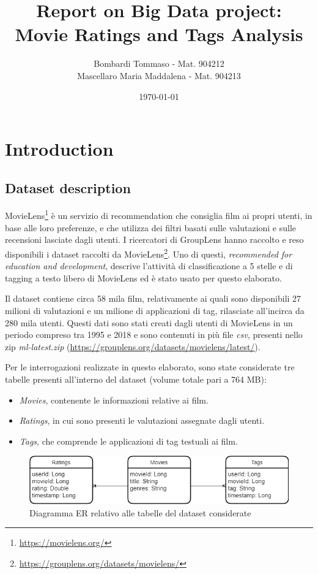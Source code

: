 \documentclass[10pt]{article}
\title{\textbf{Report on Big Data project: \\Movie Ratings and Tags Analysis}}
\author{
	Bombardi Tommaso - Mat. 904212\\
	Mascellaro Maria Maddalena - Mat. 904213}
\date{\today}
\begin{document}
\maketitle
\newpage
\tableofcontents
\newpage

\section{Introduction}

\subsection{Dataset description}

MovieLens\footnote{\url{https://movielens.org/}} è un servizio di recommendation che consiglia film ai propri utenti, in base alle loro preferenze, e che utilizza dei filtri basati sulle valutazioni e sulle recensioni lasciate dagli utenti. I ricercatori di GroupLens hanno raccolto e reso disponibili i dataset raccolti da MovieLens\footnote{\url{https://grouplens.org/datasets/movielens/}}. Uno di questi, \textit{recommended for education and development}, descrive l'attività di classificazione a 5 stelle e di tagging a testo libero di MovieLens ed è stato usato per questo elaborato.

Il dataset contiene circa 58 mila film, relativamente ai quali sono disponibili 27 milioni di valutazioni e un milione di applicazioni di tag, rilasciate all'incirca da 280 mila utenti. Questi dati sono stati creati dagli utenti di MovieLens in un periodo compreso tra 1995 e 2018 e sono contenuti in più file \textit{csv}, presenti nello zip \textit{ml-latest.zip} (\url{https://grouplens.org/datasets/movielens/latest/}).

Per le interrogazioni realizzate in questo elaborato, sono state considerate tre tabelle presenti all'interno del dataset (volume totale pari a 764 MB):

\begin{itemize}
\item \textit{Movies}, contenente le informazioni relative ai film.
\item \textit{Ratings}, in cui sono presenti le valutazioni assegnate dagli utenti.
\item \textit{Tags}, che comprende le applicazioni di tag testuali ai film.
\end{itemize}

\begin{figure}[th]
	\centering
	\includegraphics[scale=0.90]{images/MovieLensER.jpg}
	\caption{Diagramma ER relativo alle tabelle del dataset considerate}
\end{figure}
\end{document}
